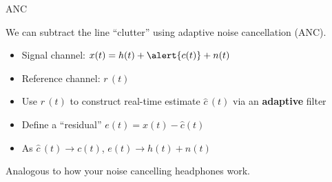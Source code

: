 \documentclass[10pt]{beamer}
\begin{document}
\begin{frame}{ANC}
	
We can subtract the line ``\alert{clutter}'' using adaptive noise cancellation (ANC). 
	
\begin{itemize}
	\item Signal channel: $x(t) = h(t) + \alert{c(t)} + n(t)$
	\item Reference channel: $r\,(t)$
	\item Use $r\,(t)$ to construct real-time estimate $\hat{c}\,(t)$ via an \textbf{adaptive} filter
	\item Define a ``residual'' $e(t) = x(t) - \hat{c}(t)$
	\item As $\hat{c}\,(t) \to c(t)$, $e(t) \to h(t) + n(t)$
\end{itemize}	

Analogous to how your noise cancelling headphones work.

\end{frame}
\end{document}
